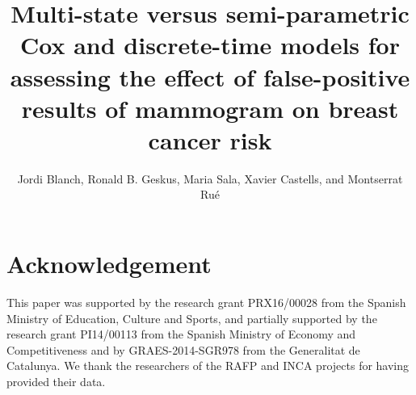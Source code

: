 \documentclass[10pt,a4paper]{article}
\author{Jordi Blanch, Ronald B. Geskus, Maria Sala, Xavier Castells, and Montserrat Ru\'e}
\title{Multi-state versus semi-parametric Cox and discrete-time models for assessing the effect of false-positive results of mammogram on breast cancer risk}
\begin{document}
\maketitle
\begin{abstract}
\end{abstract}








\clearpage

\clearpage

\clearpage

\clearpage

\section{Acknowledgement}
This paper was supported by the research grant PRX16/00028 from the Spanish Ministry of Education, Culture and Sports, and partially supported by the research grant PI14/00113 from the Spanish Ministry of Economy and Competitiveness and by GRAES-2014-SGR978 from the Generalitat de Catalunya. We thank the researchers of the RAFP and INCA projects for having provided their data.





\newpage

\appendix

\newpage




\end{document}
